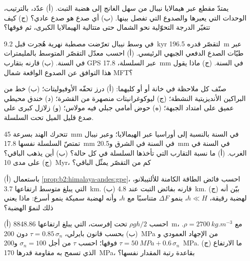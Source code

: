 \begin{exercise}[$\star$]\label{exo:b2:himalaya-andes:2}
يمتدّ مقطع عبر هيمالايا نيبال من سهل الغانج إلى هضبة التبت.
(أ) عدّد، بالترتيب، الوحدات التي يعبرها والصدوع التي تفصل بينها. (ب) أي صدع
هو صدع عادي؟ (ج) كيف تتغيّر الدرجة التحوّلية نحو الشمال حتى متتالية الهيمالايا
الكبرى، ثم فوقها؟
\end{exercise}

\begin{exercise}[$\star$]\label{exo:b2:himalaya-andes:3}
في وسط نيبال تعرّضت مصطبة نهرية هُجرت قبل \qty{9.2}{kyr} لتقصّر قدره
\qty{196.5}{m} عبر طيّات الصدع الدفعي الجبهي الرئيسي. (أ) احسب معدّل التقصّر
المتوسط بالمليمترات في السنة. (ب) قارنه بتقارب GPS عبر السلسلة،
\qty{17.8}{mm} في السنة. (ج) ماذا يقول هذا التوافق عن الصدوع الواقعة شمال MFT؟
\end{exercise}

\begin{exercise}[$\star$]\label{exo:b2:himalaya-andes:4}
صنّف كل ملاحظة في خانة  أو  أو كليهما: (أ) درز تحفّه
الأوفيوليتات؛ (ب) خط من البراكين الأنديزيتية النشطة؛ (ج) ليوكوغرانيتات منصهرة من
القشرة؛ (د) خندق محيطي عميق على امتداد الجبهة؛ (ه) حوض أمامي جبلي فيه مولاس؛
(و) زلازل كبرى على صدع قليل الميل تحت السلسلة.
\end{exercise}

\begin{exercise}[$\star\star$]\label{exo:b2:himalaya-andes:5}
تتحرك الهند بسرعة \qty{45}{mm} في السنة بالنسبة إلى أوراسيا عبر الهيمالايا؛ وعبر نيبال
تمتصّ السلسلة نفسها \qty{17.8}{mm} في السنة في الشرق و\qty{20.5}{mm} في السنة في الغرب.
(أ) ما نسبة التقارب التي تأخذها السلسلة في كل حالة؟ (ب) أين يذهب
الباقي؟ (ج) على مدى \qty{10}{Myr}، كم من التقصّر يمثّل الباقي؟
\end{exercise}

\begin{exercise}[$\star\star$]\label{exo:b2:himalaya-andes:6}
(أ) باستعمال \cref{prop:b2:himalaya-andes:gpe}، احسب فائض الطاقة الكامنة
للألتيبلانو، التي يبلغ متوسط ارتفاعها \qty{3.7}{km}. (ب) قارنه بفائض التبت عند \qty{4.8}{km}.
(ج) بيّن أنه لهضبة رقيقة، $h \ll H$، ينمو $\Delta F$ متناسبًا مع $h$، وأنه لهضبة
سميكة ينمو أسرع: ماذا يعني ذلك لنموّ الهضبة؟
\end{exercise}

\begin{exercise}[$\star\star$]\label{exo:b2:himalaya-andes:7}
(أ) احسب $\rho g h/2$ تحت إفرست، التي يبلغ ارتفاعها \qty{8848.86}{m}، مع $\rho =
\qty{2700}{kg.m^{-3}}$. (ب) بحسب قانون بايرلي، $\tau = 0.85\,\sigma_n$ دون \qty{200}{MPa} من
الإجهاد العمودي و$\tau = \qty{50}{MPa} + 0.6\,\sigma_n$ فوقها؛ احسب $\tau$ من أجل $\sigma_n =
100$ و\qty{200}{MPa}. (ج) ما الارتفاع الذي تسمح به مقاومة قدرها \qty{170}{MPa}، بقاعدة
رتبة المقدار نفسها؟
\end{exercise}


